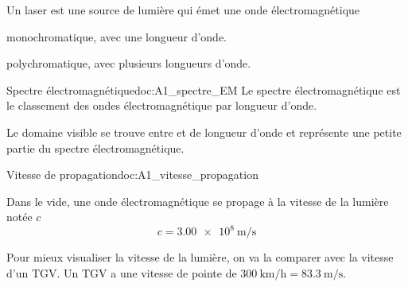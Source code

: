 \numeroQuestion
Un laser est une source de lumière qui émet une onde électromagnétique
\vspace*{-2pt}
\begin{qcm}
  \item monochromatique, avec une longueur d'onde.
  \item polychromatique, avec plusieurs longueurs d'onde.
\end{qcm}

\begin{doc}{Spectre électromagnétique}{doc:A1_spectre_EM}
  Le spectre électromagnétique est le classement des ondes électromagnétique par longueur d'onde. 
  \begin{center}
  \end{center}
  Le domaine visible se trouve entre  et  de longueur d'onde et représente une petite partie du spectre électromagnétique.
\end{doc}



\begin{doc}{Vitesse de propagation}{doc:A1_vitesse_propagation}
  \begin{importants}
    Dans le vide, une onde électromagnétique se propage à la vitesse de la lumière notée $c$
    \begin{equation*}
      c = \qty{3,00e8}{\m\per\s}
    \end{equation*}
  \end{importants}
\end{doc}

Pour mieux visualiser la vitesse de la lumière, on va la comparer avec la vitesse d'un TGV.
Un TGV a une vitesse de pointe de $\qty{300}{\km\per\hour} = \qty{83,3}{\m\per\s}$.
  



